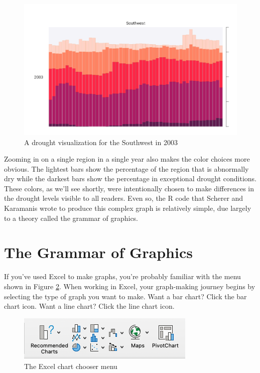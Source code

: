 \documentclass[
]{book}
\begin{document}
\begin{figure}
\includegraphics[width=1\linewidth]{data-viz_files/figure-latex/viz-sw-2003-1} \caption{A drought visualization for the Southwest in 2003}\label{fig:viz-sw-2003}
\end{figure}

Zooming in on a single region in a single year also makes the color choices more obvious. The lightest bars show the percentage of the region that is abnormally dry while the darkest bars show the percentage in exceptional drought conditions. These colors, as we'll see shortly, were intentionally chosen to make differences in the drought levels visible to all readers.
Even so, the R code that Scherer and Karamanis wrote to produce this complex graph is relatively simple, due largely to a theory called the grammar of graphics.

\hypertarget{the-grammar-of-graphics}{%
\section*{The Grammar of Graphics}\label{the-grammar-of-graphics}}

If you've used Excel to make graphs, you're probably familiar with the menu shown in Figure \ref{fig:excel-chart-chooser}. When working in Excel, your graph-making journey begins by selecting the type of graph you want to make. Want a bar chart? Click the bar chart icon. Want a line chart? Click the line chart icon.

\begin{figure}
\includegraphics[width=1\linewidth]{assets/excel-chart-chooser} \caption{The Excel chart chooser menu}\label{fig:excel-chart-chooser}
\end{figure}
\end{document}

